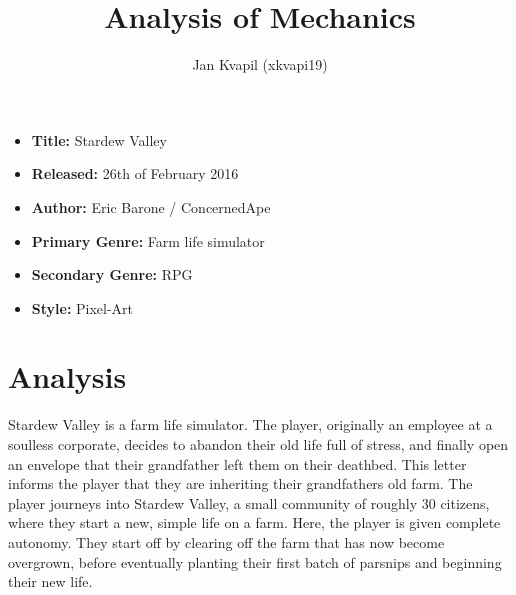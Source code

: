 \documentclass[a4paper,10pt,english]{article}
\title{%
Analysis of Mechanics%
}
\author{%
Jan Kvapil (xkvapi19)%
}
\date{}
\begin{document}
\maketitle
\thispagestyle{empty}

{%
\large

\begin{itemize}

\item[] \textbf{Title:} Stardew Valley

\item[] \textbf{Released:} 26th of February 2016

\item[] \textbf{Author:} Eric Barone / ConcernedApe

\item[] \textbf{Primary Genre:} Farm life simulator

\item[] \textbf{Secondary Genre:} RPG

\item[] \textbf{Style:} Pixel-Art

\end{itemize}

}

\section*{\centering Analysis}




Stardew Valley is a farm life simulator. The player, originally an employee at a soulless corporate, decides to abandon their old life full of stress, and finally open an envelope that their grandfather left them on their deathbed. This letter informs the player that they are inheriting their grandfathers old farm. The player journeys into Stardew Valley, a small community of roughly 30 citizens, where they start a new, simple life on a farm. Here, the player is given complete autonomy. They start off by clearing off the farm that has now become overgrown, before eventually planting their first batch of parsnips and beginning their new life. 
\end{document}
